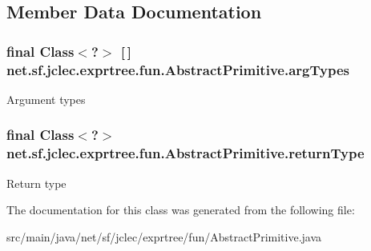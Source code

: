 \subsection{Member Data Documentation}
\hypertarget{classnet_1_1sf_1_1jclec_1_1exprtree_1_1fun_1_1_abstract_primitive_a5c366872f0b89c0ae45f08207c57f2de}{
\subsubsection[{arg\-Types}]{\setlength{\rightskip}{0pt plus 5cm}final Class$<$?$>$ \mbox{[}$\,$\mbox{]} net.\-sf.\-jclec.\-exprtree.\-fun.\-Abstract\-Primitive.\-arg\-Types\hspace{0.3cm}{\ttfamily [protected]}}}\label{classnet_1_1sf_1_1jclec_1_1exprtree_1_1fun_1_1_abstract_primitive_a5c366872f0b89c0ae45f08207c57f2de}
Argument types \hypertarget{classnet_1_1sf_1_1jclec_1_1exprtree_1_1fun_1_1_abstract_primitive_adc55259ee3939d073f17e70ddb428491}{
\subsubsection[{return\-Type}]{\setlength{\rightskip}{0pt plus 5cm}final Class$<$?$>$ net.\-sf.\-jclec.\-exprtree.\-fun.\-Abstract\-Primitive.\-return\-Type\hspace{0.3cm}{\ttfamily [protected]}}}\label{classnet_1_1sf_1_1jclec_1_1exprtree_1_1fun_1_1_abstract_primitive_adc55259ee3939d073f17e70ddb428491}
Return type 

The documentation for this class was generated from the following file\-:\begin{DoxyCompactItemize}
\item 
src/main/java/net/sf/jclec/exprtree/fun/Abstract\-Primitive.\-java\end{DoxyCompactItemize}
